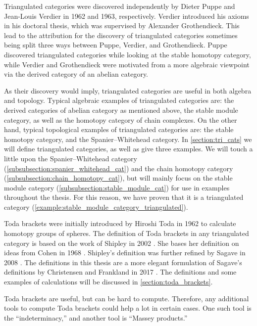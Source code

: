 Triangulated categories were discovered independently by Dieter Puppe and Jean-Louis Verdier in 1962 and 1963, respectively. Verdier introduced his axioms in his doctoral thesis, which was supervised by Alexander Grothendieck. This lead to the attribution for the discovery of triangulated categories sometimes being split three ways between Puppe, Verdier, and Grothendieck. Puppe discovered triangulated categories while looking at the stable homotopy category, while Verdier and Grothendieck were motivated from a more algebraic viewpoint via the derived category of an abelian category.

As their discovery would imply, triangulated categories are useful in both algebra and topology. Typical algebraic examples of triangulated categories are: the derived categories of abelian category as mentioned above, the stable module category, as well as the homotopy category of chain complexes. On the other hand, typical topological examples of triangulated categories are: the stable homotopy category, and the Spanier--Whitehead category. In \autoref{section:tri_cats} we will define triangulated categories, as well as give three examples. We will touch a little upon the Spanier--Whitehead category (\autoref{subsubsection:spanier_whitehead_cat}) and the chain homotopy category (\autoref{subsubsection:chain_homotopy_cat}), but will mainly focus on the stable module category (\autoref{subsubsection:stable_module_cat}) for use in examples throughout the thesis. For this reason, we have proven that it is a triangulated category (\autoref{example:stable_module_category_triangulated}).

Toda brackets were initially introduced by Hiroshi Toda in 1962 to calculate homotopy groups of spheres. The definition of Toda brackets in any triangulated category is based on the work of Shipley in 2002 \cite[Definition A.2]{Shipley_2002}. She bases her definition on ideas from Cohen in 1968 \cite[p.\ 308]{Cohen_1968}. Shipley's definition was further refined by Sagave in 2008 \cite[Remark 4.5]{Sagave_2008}. The definitions in this thesis are a more elegant formulation of Sagave's definitions by Christensen and Frankland in 2017 \cite[Definition 3.1]{Christensen-Frankland_2017}. The definitions and some examples of calculations will be discussed in \autoref{section:toda_brackets}.

Toda brackets are useful, but can be hard to compute. Therefore, any additional tools to compute Toda brackets could help a lot in certain cases. One such tool is the ``indeterminacy,'' and another tool is ``Massey products.''

